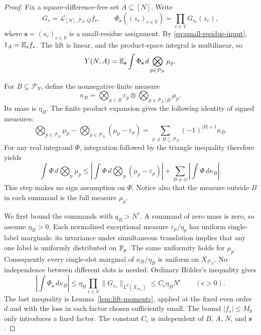 \begin{proof}
Fix a square-difference-free set $A\subseteq[N]$.  Write
\[
 G_s=\mathcal L_{[N],\mathcal P_N,Q}f_s,
 \qquad
 \Phi_{\mathbf s}((z_v)_{v\in V})=\prod_{v\in V}G_{s_v}(z_v),
\]
where $\mathbf s=(s_v)_{v\in V}$ is a small-residue assignment.  By
\eqref{eq:small-residue-input}, $1_A=\mathbb E_s f_s$.  The lift is linear, and the
product-space integral is multilinear, so
\begin{equation}
 Y(N,A)=\mathbb E_{\mathbf s}
       \int\Phi_{\mathbf s}\,d\bigotimes_{p\in\mathcal P_N}\mu_p.
 \label{eq:residue-average-functional}
\end{equation}

For $B\subseteq\mathcal P_N$, define the nonnegative finite measure
\[
 \kappa_B=
   \bigotimes_{p\in B}\varepsilon_p
   \otimes\bigotimes_{p\in\mathcal P_N\setminus B}\mu_p.
\]
Its mass is $\eta_B$.  The finite product expansion gives the following
identity of signed measures:
\begin{equation}
 \bigotimes_{p\in\mathcal P_N}\mu_p
 -\bigotimes_{p\in\mathcal P_N}(\mu_p-\varepsilon_p)
 =\sum_{\varnothing\ne B\subseteq\mathcal P_N}
       (-1)^{|B|+1}\kappa_B.
 \label{eq:signed-measure-inclusion-exclusion}
\end{equation}
For any real integrand $\Phi$, integration followed by the triangle inequality
therefore yields
\begin{equation}
 \int\Phi\,d\bigotimes_p\mu_p
 \le
 \left|\int\Phi\,d\bigotimes_p(\mu_p-\varepsilon_p)\right|
 +\sum_{B\ne\varnothing}\left|\int\Phi\,d\kappa_B\right|.
 \label{eq:exceptional-signed-bound}
\end{equation}
This step makes no sign assumption on $\Phi$.  Notice also that the measure
outside $B$ in each summand is the full measure $\mu_p$.

We first bound the summands with $q_B>N^\tau$.  A summand of zero mass is
zero, so assume $\eta_B>0$.  Each normalized exceptional measure
$\varepsilon_p/\eta_p$ has uniform single-label marginals: its invariance under
simultaneous translation implies that any one label is uniformly distributed
on $\mathbb F_p$.  The same uniformity holds for $\mu_p$.  Consequently every
single-slot marginal of $\kappa_B/\eta_B$ is uniform on
$X_{\mathcal P_N}$.  No independence between different slots is needed.
Ordinary H\"older's inequality gives
\begin{equation}
 \left|\int\Phi_{\mathbf s}\,d\kappa_B\right|
 \le\eta_B\prod_{v\in V}\|G_{s_v}\|_{L^d(X_{\mathcal P_N})}
 \le C_\epsilon\eta_BN^\epsilon
 \qquad(\epsilon>0).
 \label{eq:exceptional-holder-moment}
\end{equation}
The last inequality is Lemma~\ref{lem:lift-moments}, applied at the
fixed even order $d$ and with the loss in each factor chosen sufficiently
small.  The bound $|f_s|\le M_0$ only introduces a fixed factor.  The constant
$C_\epsilon$ is independent of $B$, $A$, $N$, and $\mathbf s$.


\end{proof}

